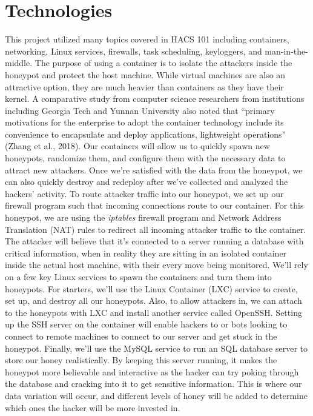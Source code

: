 \documentclass[12pt]{article}
\begin{document}
\section*{\normalsize{Technologies}}
\indent This project utilized many topics covered in HACS 101 including containers, networking, Linux services, firewalls, task scheduling, keyloggers, and man-in-the-middle. \newline
\indent The purpose of using a container is to isolate the attackers inside the honeypot and protect the host machine. While virtual machines are also an attractive option, they are much heavier than containers as they have their kernel. A comparative study from computer science researchers from institutions including Georgia Tech and Yunnan University also noted that “primary motivations for the enterprise to adopt the container technology include its convenience to encapsulate and deploy applications, lightweight operations” (Zhang et al., 2018). Our containers will allow us to quickly spawn new honeypots, randomize them, and configure them with the necessary data to attract new attackers. Once we’re satisfied with the data from the honeypot, we can also quickly destroy and redeploy after we’ve collected and analyzed the hackers’ activity. \newline
\indent To route attacker traffic into our honeypot, we set up our firewall program such that incoming connections route to our container. For this honeypot, we are using the \textit{iptables} firewall program and Network Address Translation (NAT) rules to redirect all incoming attacker traffic to the container. The attacker will believe that it’s connected to a server running a database with critical information, when in reality they are sitting in an isolated container inside the actual host machine, with their every move being monitored. \newline
\indent We'll rely on a few key Linux services to spawn the containers and turn them into honeypots. For starters, we’ll use the Linux Container (LXC) service to create, set up, and destroy all our honeypots. Also, to allow attackers in, we can attach to the honeypots with LXC and install another service called OpenSSH. Setting up the SSH server on the container will enable hackers to or bots looking to connect to remote machines to connect to our server and get stuck in the honeypot. Finally, we’ll use the MySQL service to run an SQL database server to store our honey realistically. By keeping this server running, it makes the honeypot more believable and interactive as the hacker can try poking through the database and cracking into it to get sensitive information. This is where our data variation will occur, and different levels of honey will be added to determine which ones the hacker will be more invested in. \newline
\end{document}
